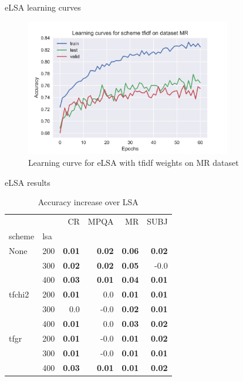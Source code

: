 \documentclass[xcolor={table}]{beamer}
\begin{document}
\begin{frame}{eLSA learning curves}
    \begin{figure}
    \centerline{\includegraphics[width=0.8\textwidth]{learning_curve_MR_tfidf}}
    \caption[Learning curve for eLSA with tfidf weights on MR dataset]{Learning curve for eLSA with tfidf weights on MR dataset}
    \label{img:learning:curve}
    \end{figure}
\end{frame} 

\begin{frame}{eLSA results}
    \smalll
\begin{table}[H]
\begin{center}

\begin{tabular}{ll|rrrr}
\toprule
   &   &   CR &  MPQA &   MR &  SUBJ \\
scheme & lsa &        &        &        &        \\
\midrule
None & 200 & \textbf{0.01} & \textbf{0.02} & \textbf{0.06} & \textbf{0.02} \\
   & 300 & \textbf{0.02} & \textbf{0.02} & \textbf{0.05} &     -0.0 \\
   & 400 & \textbf{0.03} & \textbf{0.01} & \textbf{0.04} & \textbf{0.01} \\
tfchi2 & 200 & \textbf{0.01} &      0.0 & \textbf{0.01} & \textbf{0.01} \\
   & 300 &      0.0 &     -0.0 & \textbf{0.02} & \textbf{0.01} \\
   & 400 & \textbf{0.01} &      0.0 & \textbf{0.03} & \textbf{0.02} \\
tfgr & 200 & \textbf{0.01} &     -0.0 & \textbf{0.01} & \textbf{0.02} \\
   & 300 & \textbf{0.01} &     -0.0 & \textbf{0.01} & \textbf{0.01} \\
   & 400 & \textbf{0.03} & \textbf{0.01} & \textbf{0.01} & \textbf{0.02} \\
\bottomrule
\end{tabular}

\caption[Accuracy increase over LSA]{Accuracy increase over LSA}
\label{tab:batch:results}
\end{center}
\end{table}
\end{frame}
\end{document}
